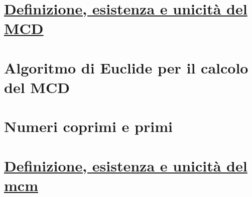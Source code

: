 \section{\underline{Definizione, esistenza e unicità del MCD}}
\section{Algoritmo di Euclide per il calcolo del MCD}
\section{Numeri coprimi e primi}
\section{\underline{Definizione, esistenza e unicità del mcm}}


